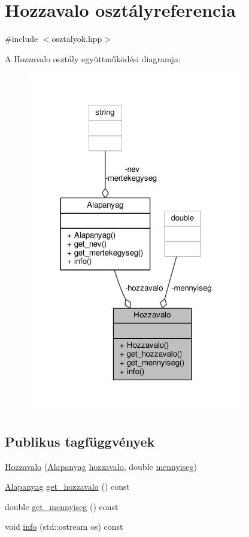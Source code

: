 \hypertarget{classHozzavalo}{}\section{Hozzavalo osztályreferencia}
\label{classHozzavalo}


{\ttfamily \#include $<$osztalyok.\+hpp$>$}



A Hozzavalo osztály együttműködési diagramja\+:\nopagebreak
\begin{figure}[H]
\begin{center}
\leavevmode
\includegraphics[width=270pt]{classHozzavalo__coll__graph}
\end{center}
\end{figure}
\subsection*{Publikus tagfüggvények}
\begin{DoxyCompactItemize}
\item 
\hyperlink{classHozzavalo_a616fae4cb079c68990413ecd8c8b97a6}{Hozzavalo} (\hyperlink{classAlapanyag}{Alapanyag} \hyperlink{classHozzavalo_ac2fd17dda552803cb220e9ea22be6793}{hozzavalo}, double \hyperlink{classHozzavalo_a31c9579b4bd274ef7ad5e934a90e0780}{mennyiseg})
\item 
\hyperlink{classAlapanyag}{Alapanyag} \hyperlink{classHozzavalo_adcb8f8c51e9ec20c3e106846b2143c3a}{get\+\_\+hozzavalo} () const 
\item 
double \hyperlink{classHozzavalo_a750b741dfbbdcf1d54476c1d124f736c}{get\+\_\+mennyiseg} () const 
\item 
void \hyperlink{classHozzavalo_aee49a4ae7c61f37d1bfee9d5115db4ff}{info} (std\+::ostream os) const 
\end{DoxyCompactItemize}
